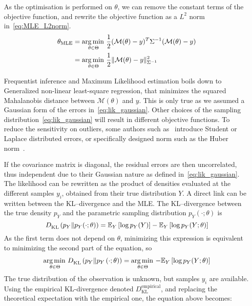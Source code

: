 \documentclass[../../Main_ManuscritThese.tex]{subfiles}
\begin{document}
As the optimisation is performed on $\theta$, we can remove the constant terms of the objective function, and rewrite the objective function as a $L^2$ norm in~\cref{eq:MLE_L2norm}.  %
  \begin{align}
    {\theta}_{\mathrm{MLE}} &= \operatorname*{arg\,min \,}_{\theta \in \Theta}\frac{1}{2}(\mathcal{M}(\theta) - y)^T\Sigma^{-1}(\mathcal{M}(\theta) - y) \nonumber\\
                           &= \operatorname*{arg\,min \,}_{\theta \in \Theta}\frac12 \| \mathcal{M}(\theta) - y \|^2_{\Sigma^{-1}} \label{eq:MLE_L2norm}
  \end{align}

  Frequentist inference and Maximum Likelihood estimation boils down to Generalized non-linear least-square regression, that minimizes the squared Mahalanobis distance between $\mathcal{M}({\theta})$ and $y$. This is only true as we assumed a Gaussian form of the errors in~\cref{eq:lik_gaussian}. Other choices of the sampling distribution~\cref{eq:lik_gaussian} will result in different objective functions. To reduce the sensitivity on outliers, some authors such as~\cite{rao_robust_2015} introduce Student or Laplace distributed errors, or specifically designed norm such as the Huber norm~\cite{huber_robust_2011}.

  If the covariance matrix is diagonal, the residual errors are then uncorrelated, thus independent due to their Gaussian nature as defined in~\cref{eq:lik_gaussian}. The likelihood can be rewritten as the product of densities evaluated at the different samples $y_i$, obtained from their true distribution $Y$.
  A direct link can be written between the KL--divergence and the MLE. The KL--divergence between the true density $p_Y$ and the parametric sampling distribution $p_Y(\cdot;\theta)$ is
  \begin{equation}
  D^{\mathrm{}}_{\mathrm{KL}}\left(p_Y \| p_Y(\cdot;\theta)\right) = \mathbb{E}_Y\left[\log p_Y(Y)\right]-\mathbb{E}_Y\left[\log p_Y(Y;\theta)\right]  
\end{equation}
As the first term does not depend on $\theta$, minimizing this expression is equivalent to minimizing the second part of the equation, so
\begin{align}
 \operatorname*{arg\,min \,}_{\theta \in\Theta} D^{\mathrm{}}_{\mathrm{KL}}\left(p_Y \| p_Y\left(\cdot;\theta \right)\right) = \operatorname*{arg\,min \,}_{\theta \in \Theta} -\mathbb{E}_{Y}\left[\log p_{Y}(Y ; \theta)\right]
\end{align}
The true distribution of the observation is unknown, but samples $y_i$ are available. Using the empirical KL-divergence denoted $D^{\mathrm{empirical}}_{\mathrm{KL}}$,  and replacing the theoretical expectation with the empirical one, the equation above becomes:
\end{document}
